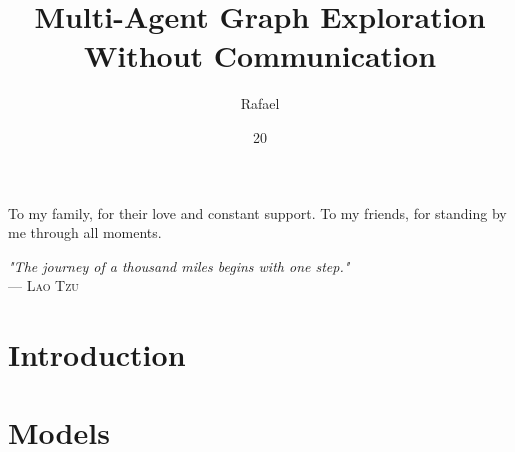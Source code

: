 \documentclass[tg, eng]{ita}    %
\author{Rafael}{Studart Mattos Di Piero}
\title{Multi-Agent Graph Exploration Without Communication}
\date{20}{Jun}{2024}
\begin{document}
\maketitle

\begin{itadedication}
  To my family, for their love and constant support. 
  To my friends, for standing by me through all moments. 
\end{itadedication}

\begin{itathanks}

\end{itathanks}


\thispagestyle{empty}
\ifhyperref{}\fi
\begin{flushright}
\begin{spacing}{1}
\mbox{}\vfill
{\sffamily\itshape
"The journey of a thousand miles begins with one step."\\
}
--- \textsc{
Lao Tzu
}
\end{spacing}
\end{flushright}

\begin{abstract}
\noindent

\end{abstract}

\begin{englishabstract}
\noindent

\end{englishabstract}

\listoffigures %



\listofabbreviations


\tableofcontents

\mainmatter

\chapter{Introduction}


\chapter{Models}

\end{document}
